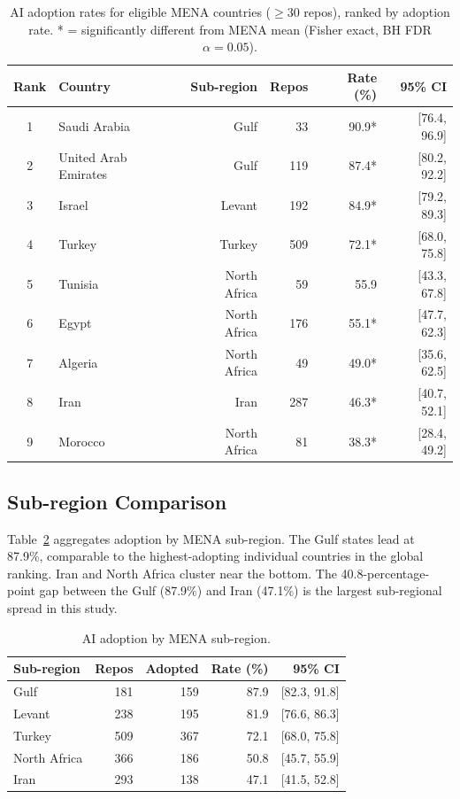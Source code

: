 \begin{table}[h]
\centering
\caption{AI adoption rates for eligible MENA countries ($\geq 30$ repos), ranked by adoption rate.
         * = significantly different from MENA mean (Fisher exact, BH FDR $\alpha = 0.05$).}
\label{tab:mena_ranking}
\begin{tabular}{@{}clrrrr@{}}
\toprule
Rank & Country & Sub-region & Repos & Rate (\%) & 95\% CI \\
\midrule
1 & Saudi Arabia          & Gulf         &  33 & 90.9* & [76.4, 96.9] \\
2 & United Arab Emirates  & Gulf         & 119 & 87.4* & [80.2, 92.2] \\
3 & Israel                & Levant       & 192 & 84.9* & [79.2, 89.3] \\
4 & Turkey                & Turkey       & 509 & 72.1* & [68.0, 75.8] \\
5 & Tunisia               & North Africa &  59 & 55.9  & [43.3, 67.8] \\
6 & Egypt                 & North Africa & 176 & 55.1* & [47.7, 62.3] \\
7 & Algeria               & North Africa &  49 & 49.0* & [35.6, 62.5] \\
8 & Iran                  & Iran         & 287 & 46.3* & [40.7, 52.1] \\
9 & Morocco               & North Africa &  81 & 38.3* & [28.4, 49.2] \\
\bottomrule
\end{tabular}
\end{table}

\subsection{Sub-region Comparison}

Table~\ref{tab:mena_subregion} aggregates adoption by MENA sub-region. The Gulf states lead at 87.9\%, comparable to the highest-adopting individual countries in the global ranking. Iran and North Africa cluster near the bottom. The 40.8-percentage-point gap between the Gulf (87.9\%) and Iran (47.1\%) is the largest sub-regional spread in this study.

\begin{table}[h]
\centering
\caption{AI adoption by MENA sub-region.}
\label{tab:mena_subregion}
\begin{tabular}{@{}lrrrr@{}}
\toprule
Sub-region & Repos & Adopted & Rate (\%) & 95\% CI \\
\midrule
Gulf         & 181 & 159 & 87.9 & [82.3, 91.8] \\
Levant       & 238 & 195 & 81.9 & [76.6, 86.3] \\
Turkey       & 509 & 367 & 72.1 & [68.0, 75.8] \\
North Africa & 366 & 186 & 50.8 & [45.7, 55.9] \\
Iran         & 293 & 138 & 47.1 & [41.5, 52.8] \\
\bottomrule
\end{tabular}
\end{table}

